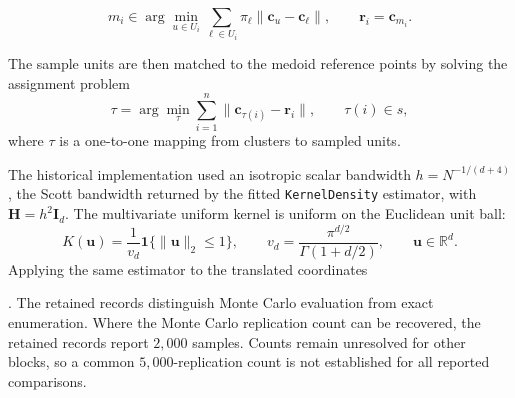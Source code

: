 
\[
m_i
\in
\arg\min_{u\in U_i}
\sum_{\ell\in U_i}\pi_\ell
\|\bm c_u-\bm c_\ell\|,
\qquad
\bm r_i=\bm c_{m_i}.
\]

The sample units are then matched to the medoid reference points by solving the
assignment problem
\[
\tau
=
\arg\min_{\tau}
\sum_{i=1}^n
\|\bm c_{\tau(i)}-\bm r_i\|,
\qquad
\tau(i)\in s,
\]
where \(\tau\) is a one-to-one mapping from clusters to sampled units.

The historical implementation used an isotropic scalar bandwidth
\(h=N^{-1/(d+4)}\), the Scott bandwidth returned by the fitted
\texttt{KernelDensity} estimator, with \(\mathbf H=h^2\mathbf I_d\).
The multivariate uniform kernel is uniform on the Euclidean unit ball:
\[
K(\bm u)=\frac{1}{v_d}\mathbf 1\{\|\bm u\|_2\leq1\},
\qquad
v_d=\frac{\pi^{d/2}}{\Gamma(1+d/2)},
\qquad \bm u\in\mathbb R^d.
\]
Applying the same estimator to the translated coordinates

\citep{sampling_pkg}. The retained records distinguish Monte Carlo evaluation
from exact enumeration. Where the Monte Carlo replication count can be
recovered, the retained records report \(2{,}000\) samples. Counts remain
unresolved for other blocks, so a common \(5{,}000\)-replication count is not
established for all reported comparisons.

